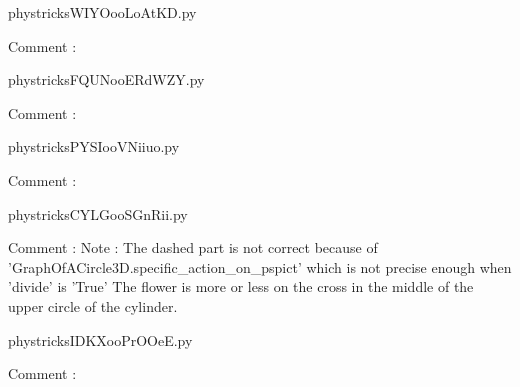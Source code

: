     \newcommand{\CaptionFigWIYOooLoAtKD}{<+Type your caption here+>}
    \begin{center}
        
    \end{center}
    phystricksWIYOooLoAtKD.py

    Comment : 

    \clearpage
    


    \newcommand{\CaptionFigFQUNooERdWZY}{<+Type your caption here+>}
    \begin{center}
        
    \end{center}
    phystricksFQUNooERdWZY.py

    Comment : 

    \clearpage
    


    \newcommand{\CaptionFigPYSIooVNiiuo}{<+Type your caption here+>}
    \begin{center}
        
    \end{center}
    phystricksPYSIooVNiiuo.py

    Comment : 

    \clearpage
    


    \newcommand{\CaptionFigCYLGooSGnRii}{<+Type your caption here+>}
    \begin{center}
        
    \end{center}
    phystricksCYLGooSGnRii.py

    Comment : Note : The dashed part is not correct because of 'GraphOfACircle3D.specific\_action\_on\_pspict' which is not precise enough when 'divide' is 'True'
 The flower is more or less on the cross in the middle of the upper circle of the cylinder.

    \clearpage
    


    \newcommand{\CaptionFigIDKXooPrOOeE}{<+Type your caption here+>}
    \begin{center}
        
    \end{center}
    phystricksIDKXooPrOOeE.py

    Comment : 

